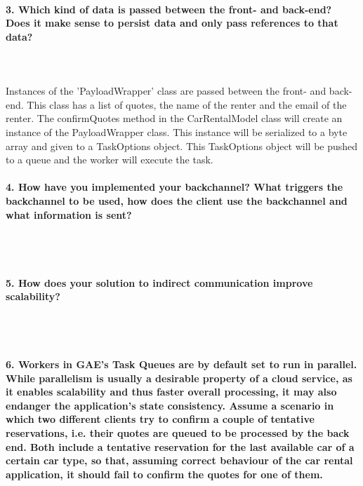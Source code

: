 \documentclass{ds-report}
\begin{document}
	\paragraph{3. Which kind of data is passed between the front- and back-end? Does it make sense to persist data and only pass references to that data?} \mbox{}\\\\
Instances of the 'PayloadWrapper' class are passed between the front- and back-end. This class has a list of quotes, the name of the renter and the email of the renter. The confirmQuotes method in the CarRentalModel class will create an instance of the PayloadWrapper class. This instance will be serialized to a byte array and given to a TaskOptions object. This TaskOptions object will be pushed to a queue and the worker will execute the task.




	\paragraph{4. How have you implemented your backchannel? What triggers the backchannel to be used, how does the client use the backchannel and what information is sent?} \mbox{}\\\\





	\paragraph{5. How does your solution to indirect communication improve scalability?} \mbox{}\\\\


		\paragraph{6. Workers in GAE’s Task Queues are by default set to run in parallel. While parallelism is usually a desirable property of a cloud service, as it enables scalability and thus faster overall processing, it may also endanger the application’s state consistency. Assume a scenario in which two different clients try to confirm a couple of tentative reservations, i.e. their quotes are queued to be processed by the back end. Both include a tentative reservation for the last available car of a certain car type, so that, assuming correct behaviour of the car rental application, it should fail to confirm the quotes for one of them.} \mbox{}\\\\
\end{document}
